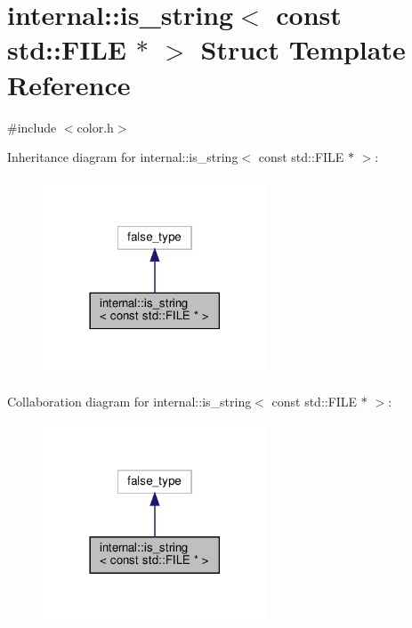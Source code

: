 \hypertarget{structinternal_1_1is__string_3_01const_01std_1_1_f_i_l_e_01_5_01_4}{}\section{internal\+:\+:is\+\_\+string$<$ const std\+:\+:F\+I\+LE $\ast$ $>$ Struct Template Reference}
\label{structinternal_1_1is__string_3_01const_01std_1_1_f_i_l_e_01_5_01_4}


{\ttfamily \#include $<$color.\+h$>$}



Inheritance diagram for internal\+:\+:is\+\_\+string$<$ const std\+:\+:F\+I\+LE $\ast$ $>$\+:
\nopagebreak
\begin{figure}[H]
\begin{center}
\leavevmode
\includegraphics[width=189pt]{structinternal_1_1is__string_3_01const_01std_1_1_f_i_l_e_01_5_01_4__inherit__graph}
\end{center}
\end{figure}


Collaboration diagram for internal\+:\+:is\+\_\+string$<$ const std\+:\+:F\+I\+LE $\ast$ $>$\+:
\nopagebreak
\begin{figure}[H]
\begin{center}
\leavevmode
\includegraphics[width=189pt]{structinternal_1_1is__string_3_01const_01std_1_1_f_i_l_e_01_5_01_4__coll__graph}
\end{center}
\end{figure}


